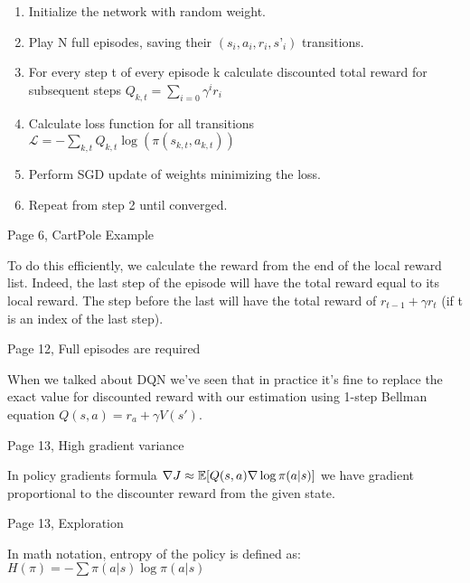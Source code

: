 \begin{enumerate}
\item Initialize the network with random weight.
\item Play N full episodes, saving their \begin{math}(s_i, a_i, r_i, s’_i)\end{math} transitions.
\item
  For every step t of every episode k calculate discounted total reward for
  subsequent steps \begin{math}Q_{k,t} = \sum_{i=0}\gamma^ir_i\end{math}
\item Calculate loss function for all transitions \begin{math}\mathcal{L} =
  -\sum_{k,t}Q_{k,t}\log(\pi(s_{k,t}, a_{k,t}))\end{math}
\item Perform SGD update of weights minimizing the loss.
\item Repeat from step 2 until converged.
\end{enumerate}


Page 6, CartPole Example

To do this efficiently, we calculate the reward from the end of the local reward list. Indeed, the last step of the episode will have the total reward equal to its local reward. The step before the last will have the total reward of
\begin{math}r_{t-1} + \gamma r_t\end{math} (if t is an index of the last step).


Page 12, Full episodes are required

When we talked about DQN we’ve seen that in practice it’s fine to replace the
exact value for discounted reward with our estimation using 1-step Bellman
equation \begin{math}Q(s, a) = r_a + \gamma V(s')\end{math}.


Page 13, High gradient variance

In policy gradients formula \begin{math}\nabla J \approx \operatorname{\mathbb{E}}[Q(s, a) \nabla\log \pi(a|s)]\end{math} we have gradient
proportional to the discounter reward from the given state.

Page 13, Exploration

In math notation, entropy of the policy is defined as: \begin{math}H(\pi) =
  -\sum \pi(a|s)\log \pi(a|s)\end{math}

